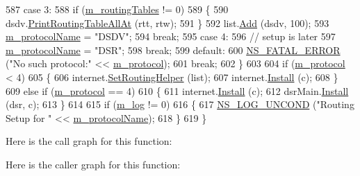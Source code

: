 \begin{DoxyCode}
587     \textcolor{keywordflow}{case} 3:
588       \textcolor{keywordflow}{if} (\hyperlink{classRoutingHelper_a39d850cd28027d771bb503c4f12e5986}{m\_routingTables} != 0)
589         \{
590           dsdv.\hyperlink{classns3_1_1Ipv4RoutingHelper_a10d8ba23eca330de968fdfbca2730ec3}{PrintRoutingTableAllAt} (rtt, rtw);
591         \}
592       list.\hyperlink{classns3_1_1Ipv4ListRoutingHelper_a697287d45297478735082f691ad06fa3}{Add} (dsdv, 100);
593       \hyperlink{classRoutingHelper_aec432269dde7fd896550370d29fb5eca}{m\_protocolName} = \textcolor{stringliteral}{"DSDV"};
594       \textcolor{keywordflow}{break};
595     \textcolor{keywordflow}{case} 4:
596       \textcolor{comment}{// setup is later}
597       \hyperlink{classRoutingHelper_aec432269dde7fd896550370d29fb5eca}{m\_protocolName} = \textcolor{stringliteral}{"DSR"};
598       \textcolor{keywordflow}{break};
599     \textcolor{keywordflow}{default}:
600       \hyperlink{group__fatal_ga5131d5e3f75d7d4cbfd706ac456fdc85}{NS\_FATAL\_ERROR} (\textcolor{stringliteral}{"No such protocol:"} << \hyperlink{classRoutingHelper_a14f730151136d699031105c1db7990b0}{m\_protocol});
601       \textcolor{keywordflow}{break};
602     \}
603 
604   \textcolor{keywordflow}{if} (\hyperlink{classRoutingHelper_a14f730151136d699031105c1db7990b0}{m\_protocol} < 4)
605     \{
606       internet.\hyperlink{classns3_1_1InternetStackHelper_a3e382c02df022dec79952a7eca8cd5ba}{SetRoutingHelper} (list);
607       internet.\hyperlink{classns3_1_1InternetStackHelper_a6645b412f31283d2d9bc3d8a95cebbc0}{Install} (c);
608     \}
609   \textcolor{keywordflow}{else} \textcolor{keywordflow}{if} (\hyperlink{classRoutingHelper_a14f730151136d699031105c1db7990b0}{m\_protocol} == 4)
610     \{
611       internet.\hyperlink{classns3_1_1InternetStackHelper_a6645b412f31283d2d9bc3d8a95cebbc0}{Install} (c);
612       dsrMain.\hyperlink{classns3_1_1DsrMainHelper_a408d7c024fb51bc54012b6f728a7fec4}{Install} (dsr, c);
613     \}
614 
615   \textcolor{keywordflow}{if} (\hyperlink{classRoutingHelper_a1f498457a16bb49a0aa7fa395848e0ed}{m\_log} != 0)
616     \{
617       \hyperlink{log-macros-disabled_8h_a0b36e5e182b37194f85ef1c5e979fb2e}{NS\_LOG\_UNCOND} (\textcolor{stringliteral}{"Routing Setup for "} << \hyperlink{classRoutingHelper_aec432269dde7fd896550370d29fb5eca}{m\_protocolName});
618     \}
619 \}
\end{DoxyCode}


Here is the call graph for this function\+:




Here is the caller graph for this function\+:





